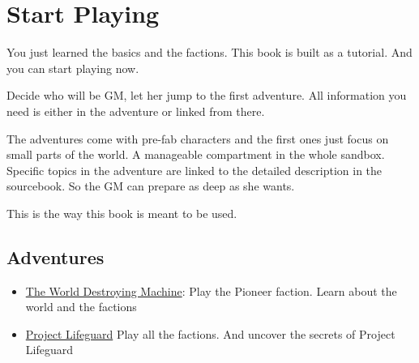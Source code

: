 \chapter{Start Playing}

You just learned the basics and the factions. This book is built as a tutorial. And you can start playing now.

Decide who will be GM, let her jump to the first adventure. All information you need is either in the adventure or linked from there.

The adventures come with pre-fab characters and the first ones just focus on small parts of the world. A manageable compartment in the whole sandbox.
Specific topics in the adventure are linked to the detailed description in the sourcebook. So the GM can prepare as deep as she wants.

This is the way this book is meant to be used.

\section{Adventures}

\begin{itemize}
\item \hyperref[ch:the world destroying machine]{The World Destroying Machine}: Play the Pioneer faction. Learn about the world and the factions
\item \hyperref[ch:project lifeguard]{Project Lifeguard} Play all the factions. And uncover the secrets of Project Lifeguard
\end{itemize}